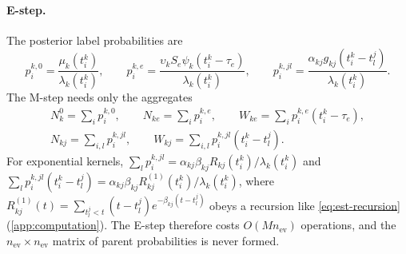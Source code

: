 \paragraph{E-step.} The posterior label probabilities are
\[
  p^{k,0}_i=\frac{\mu_k(t^k_i)}{\lambda_k(t^k_i)},\qquad
  p^{k,e}_i=\frac{\upsilon_kS_e\psi_k(t^k_i-\tau_e)}{\lambda_k(t^k_i)},\qquad
  p^{k,jl}_i=\frac{\alpha_{kj}g_{kj}(t^k_i-t^j_l)}{\lambda_k(t^k_i)} .
\]
The M-step needs only the aggregates
\begin{equation}\label{eq:est-stats}
\begin{gathered}
  N^0_k=\sum_ip^{k,0}_i,\qquad N_{ke}=\sum_ip^{k,e}_i,\qquad W_{ke}=\sum_ip^{k,e}_i(t^k_i-\tau_e),\\
  N_{kj}=\sum_{i,l}p^{k,jl}_i,\qquad W_{kj}=\sum_{i,l}p^{k,jl}_i(t^k_i-t^j_l).
\end{gathered}
\end{equation}
For exponential kernels,
$\sum_lp^{k,jl}_i=\alpha_{kj}\beta_{kj}R_{kj}(t^k_i)/\lambda_k(t^k_i)$ and
$\sum_lp^{k,jl}_i(t^k_i-t^j_l)=\alpha_{kj}\beta_{kj}R^{(1)}_{kj}(t^k_i)/\lambda_k(t^k_i)$, where
$R^{(1)}_{kj}(t)=\sum_{t^j_l<t}(t-t^j_l)e^{-\beta_{kj}(t-t^j_l)}$ obeys a recursion like
\eqref{eq:est-recursion} (\cref{app:computation}). The E-step therefore costs $O(Mn_{\mathrm{ev}})$
operations, and the $n_{\mathrm{ev}}\times n_{\mathrm{ev}}$ matrix of parent probabilities is never formed.

